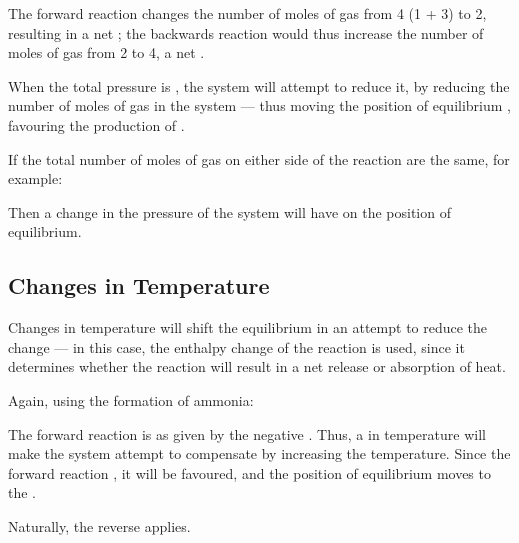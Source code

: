 			The forward reaction changes the number of moles of gas from \num{4} (\num{1} + \num{3}) to \num{2}, resulting in a net
			; the backwards reaction would thus increase the number of moles of gas from \num{2} to \num{4}, a net
			.

			When the total pressure is , the system will attempt to reduce it, by reducing the number of moles of gas
			in the system --- thus moving the position of equilibrium , favouring the production of .

			\pagebreak
			If the total number of moles of gas on either side of the reaction are the same, for example:


			Then a change in the pressure of the system will have  on the position of equilibrium.



		\subsection{Changes in Temperature}

			Changes in temperature will shift the equilibrium in an attempt to reduce the change --- in this case, the enthalpy change
			of the reaction is used, since it determines whether the reaction will result in a net release or absorption of heat.

			Again, using the formation of ammonia:


			The forward reaction is  as given by the negative \enth{}. Thus, a  in temperature will
			make the system attempt to compensate by increasing the temperature. Since the forward reaction , it will
			be favoured, and the position of equilibrium moves to the .

			Naturally, the reverse applies.

